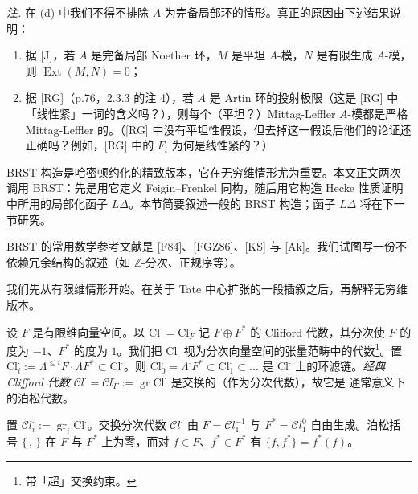 

\emph{注.} 在 (d) 中我们不得不排除 $A$ 为完备局部环的情形。真正的原因由下述结果说明：
\begin{enumerate}[label=\arabic*),leftmargin=2.6em]
\item 据 [J]，若 $A$ 是完备局部 Noether 环，$M$ 是平坦 $A$-模，$N$ 是有限生成 $A$-模，则 $\operatorname{Ext}(M,N)=0$；
\item 据 [RG]（p.76，2.3.3 的注 4），若 $A$ 是 Artin 环的投射极限（这是 [RG] 中「线性紧」一词的含义吗？），则每个（平坦？）Mittag-Leffler $A$-模都是严格 Mittag-Leffler 的。（[RG] 中没有平坦性假设，但去掉这一假设后他们的论证还正确吗？例如，[RG] 中的 $F_i$ 为何是线性紧的？）
\end{enumerate}


BRST 构造是哈密顿约化的精致版本，它在无穷维情形尤为重要。本文正文两次调用 BRST：先是用它定义 Feigin--Frenkel 同构，随后用它构造 Hecke 性质证明中所用的局部化函子 $L\Delta$。本节简要叙述一般的 BRST 构造；函子 $L\Delta$ 将在下一节研究。

BRST 的常用数学参考文献是 [F84]、[FGZ86]、[KS] 与 [Ak]。我们试图写一份不依赖冗余结构的叙述（如 $\mathbb{Z}$-分次、正规序等）。

我们先从有限维情形开始。在关于 Tate 中心扩张的一段插叙之后，再解释无穷维版本。

 设 $F$ 是有限维向量空间。以 $\mathrm{Cl}^{\cdot}=\mathrm{Cl}^{\cdot}_F$ 记 $F\oplus F^{*}$ 的 Clifford 代数，其分次使 $F$ 的度为 $-1$、$F^{*}$ 的度为 $1$。我们把 $\mathrm{Cl}^{\cdot}$ 视为分次向量空间的张量范畴中的代数\footnote{带「超」交换约束。}。置 $\mathrm{Cl}^{\cdot}_i:=\Lambda^{\le i}F\cdot\Lambda F^{*}\subset\mathrm{Cl}^{\cdot}$。则 $\mathrm{Cl}^{\cdot}_0=\Lambda^{\cdot}F^{*}\subset\mathrm{Cl}^{\cdot}_1\subset\ldots$ 是 $\mathrm{Cl}^{\cdot}$ 上的环滤链。\emph{经典 Clifford 代数} $\mathcal{C}l^{\cdot}=\mathcal{C}l^{\cdot}_F:=\operatorname{gr}\mathrm{Cl}^{\cdot}$ 是交换的（作为分次代数），故它是%
通常意义下的泊松代数。

置 $\mathcal{C}l^{\cdot}_i:=\operatorname{gr}_i\mathrm{Cl}^{\cdot}$。交换分次代数 $\mathcal{C}l^{\cdot}$ 由 $F=\mathcal{C}l^{-1}_1$ 与 $F^{*}=\mathcal{C}l^{0}_1$ 自由生成。泊松括号 $\{\,,\,\}$ 在 $F$ 与 $F^{*}$ 上为零，而对 $f\in F$、$f^{*}\in F^{*}$ 有 $\{f,f^{*}\}=f^{*}(f)$。


